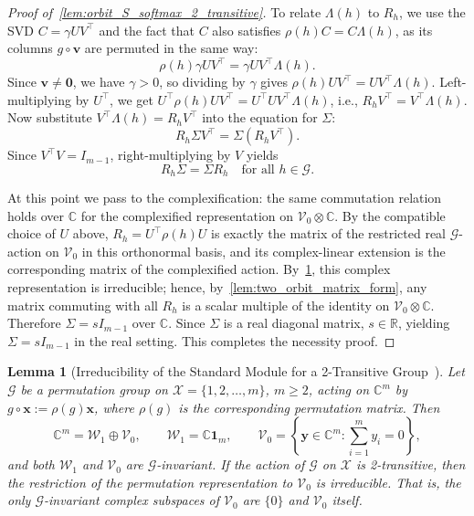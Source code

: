 \documentclass[11pt]{article}
\newtheorem{lemma}{Lemma}
\begin{document}
\begin{proof}[Proof of~\cref{lem:orbit_S_softmax_2_transitive}]
To relate \(\Lambda(h)\) to \(R_h\), we use the SVD \(C = \gamma U V^{\top}\) and the fact that \(C\) also satisfies \(\rho(h)C = C\Lambda(h)\), as its columns \(g\circ\boldsymbol{v}\) are permuted in the same way:
\[
\rho(h)\gamma U V^{\top} = \gamma U V^{\top} \Lambda(h).
\]
Since \(\boldsymbol{v}\ne\boldsymbol{0}\), we have \(\gamma>0\), so dividing by \(\gamma\) gives \(\rho(h)U V^{\top} = U V^{\top} \Lambda(h)\). Left-multiplying by \(U^{\top}\), we get \(U^{\top}\rho(h)U V^{\top} = U^{\top} U V^{\top} \Lambda(h)\), i.e., \(R_h V^{\top} = V^{\top} \Lambda(h)\). Now substitute \(V^{\top} \Lambda(h) = R_h V^{\top}\) into the equation for \(\Sigma\):
\[
R_h \Sigma V^{\top} = \Sigma (R_h V^{\top}).
\]
Since \(V^{\top} V = I_{m-1}\), right-multiplying by \(V\) yields
\[
R_h \Sigma = \Sigma R_h \quad \text{for all } h \in \mathcal G.
\]

At this point we pass to the complexification: the same commutation relation holds over \(\mathbb{C}\) for the complexified representation on \(\mathcal V_0 \otimes \mathbb{C}\). By the compatible choice of \(U\) above, \(R_h=U^{\top}\rho(h)U\) is exactly the matrix of the restricted real \(\mathcal G\)-action on \(\mathcal V_0\) in this orthonormal basis, and its complex-linear extension is the corresponding matrix of the complexified action. By~\cref{lem:irreducibility_2_transitive_action}, this complex representation is irreducible; hence, by~\cref{lem:two_orbit_matrix_form}, any matrix commuting with all \(R_h\) is a scalar multiple of the identity on \(\mathcal V_0 \otimes \mathbb{C}\). Therefore \(\Sigma = s I_{m-1}\) over \(\mathbb{C}\). Since \(\Sigma\) is a real diagonal matrix, \(s \in \mathbb{R}\), yielding \(\Sigma = s I_{m-1}\) in the real setting. This completes the necessity proof.
\end{proof}

\begin{lemma}[Irreducibility of the Standard Module for a 2-Transitive Group~\citep{serre1977linear}]
\label{lem:irreducibility_2_transitive_action}
Let \(\mathcal G\) be a permutation group on \(\mathcal X=\{1,2,\ldots,m\}\), \(m\ge 2\), acting on
\(\mathbb C^m\) by \(g\circ\boldsymbol{x}:=\rho(g)\boldsymbol{x}\), where \(\rho(g)\) is the corresponding permutation matrix.
Then
\[
\mathbb C^m=\mathcal W_1\oplus \mathcal V_0,
\qquad
\mathcal W_1=\mathbb C\boldsymbol{1}_m,
\qquad
\mathcal V_0=\left\{\boldsymbol{y}\in\mathbb C^m:\sum_{i=1}^m y_i=0\right\},
\]
and both \(\mathcal W_1\) and \(\mathcal V_0\) are \(\mathcal G\)-invariant.
If the action of \(\mathcal G\) on \(\mathcal X\) is 2-transitive, then the restriction of the
permutation representation to \(\mathcal V_0\) is irreducible.
That is, the only \(\mathcal G\)-invariant complex subspaces of \(\mathcal V_0\) are \(\{0\}\) and \(\mathcal V_0\) itself.
\end{lemma}
\end{document}

